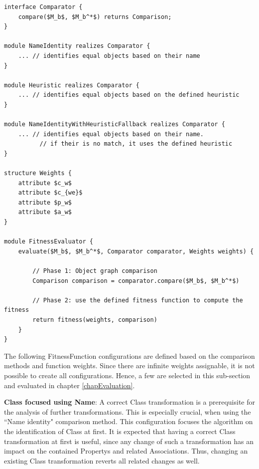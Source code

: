 \begin{lstlisting}[language=PSEUDO,caption={Fitness evaluation in pseudo code},label={lstFitnessEvaluator},mathescape]
interface Comparator {
	compare($M_b$, $M_b^*$) returns Comparison;
}

module NameIdentity realizes Comparator {
	... // identifies equal objects based on their name
}

module Heuristic realizes Comparator {
	... // identifies equal objects based on the defined heuristic
}

module NameIdentityWithHeuristicFallback realizes Comparator {
	... // identifies equal objects based on their name.
		  // if their is no match, it uses the defined heuristic
}

structure Weights {
	attribute $c_w$
	attribute $c_{we}$
	attribute $p_w$
	attribute $a_w$
}

module FitnessEvaluator {
	evaluate($M_b$, $M_b^*$, Comparator comparator, Weights weights) {
	
		// Phase 1: Object graph comparison
		Comparison comparison = comparator.compare($M_b$, $M_b^*$)
		
		// Phase 2: use the defined fitness function to compute the fitness
		return fitness(weights, comparison)	
	}
}
\end{lstlisting}

The following \gls{FitnessFunction} configurations are defined based on the comparison methods and function weights. Since there are infinite weights assignable, it is not possible to create all configurations. Hence, a few are selected in this sub-section and evaluated in chapter \ref{chapEvaluation}.

\textbf{Class focused using Name}: A correct \gls{Class} transformation is a prerequisite for the analysis of further transformations. This is especially crucial, when using the ``Name identity" comparison method. This configuration focuses the algorithm on the identification of \gls{Class} at first. It is expected that having a correct \gls{Class} transformation at first is useful, since any change of such a transformation has an impact on the contained \glspl{Property} and related \glspl{Association}. Thus, changing an existing \gls{Class} transformation reverts all related changes as well.

